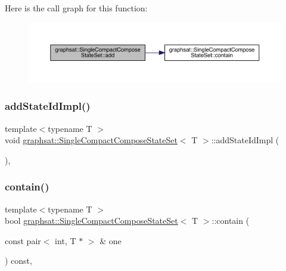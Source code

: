 Here is the call graph for this function\+:\nopagebreak
\begin{figure}[H]
\begin{center}
\leavevmode
\includegraphics[width=350pt]{classgraphsat_1_1_single_compact_compose_state_set_a7f5aa3bcf4d884372d99fe33402a4f0a_cgraph}
\end{center}
\end{figure}
\mbox{\label{classgraphsat_1_1_single_compact_compose_state_set_a9ac36db887993967dd58f3a3e4ee7551}} 
\subsubsection{\texorpdfstring{addStateIdImpl()}{addStateIdImpl()}}
{\footnotesize\ttfamily template$<$typename T $>$ \\
void \mbox{\hyperlink{classgraphsat_1_1_single_compact_compose_state_set}{graphsat\+::\+Single\+Compact\+Compose\+State\+Set}}$<$ T $>$\+::add\+State\+Id\+Impl (\begin{DoxyParamCaption}{ }\end{DoxyParamCaption})\hspace{0.3cm}{\ttfamily [inline]}, {\ttfamily [protected]}}

\mbox{\label{classgraphsat_1_1_single_compact_compose_state_set_ac42bca39e3e7a2eabaacba1e978b11ef}} 
\subsubsection{\texorpdfstring{contain()}{contain()}}
{\footnotesize\ttfamily template$<$typename T $>$ \\
bool \mbox{\hyperlink{classgraphsat_1_1_single_compact_compose_state_set}{graphsat\+::\+Single\+Compact\+Compose\+State\+Set}}$<$ T $>$\+::contain (\begin{DoxyParamCaption}\item[{const pair$<$ int, T $\ast$ $>$ \&}]{one }\end{DoxyParamCaption}) const\hspace{0.3cm}{\ttfamily [inline]}, {\ttfamily [virtual]}}



